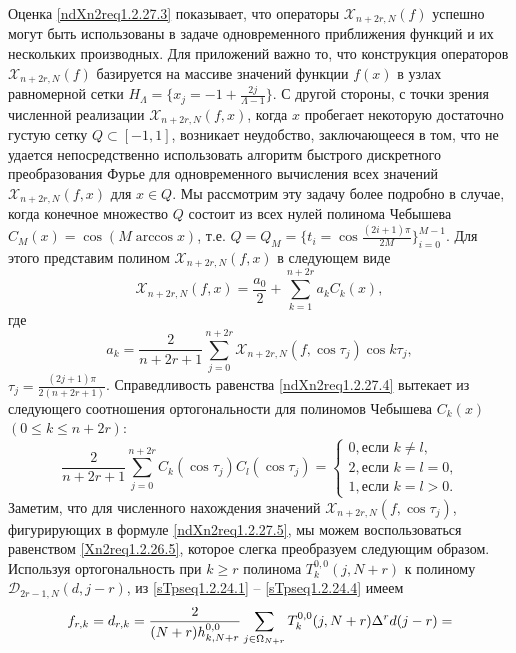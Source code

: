 Оценка \eqref{ndXn2req1.2.27.3} показывает, что операторы $\mathcal{X}_{n+2r,N}(f)$ успешно могут быть использованы в задаче одновременного приближения функций и их нескольких производных. Для приложений важно то, что конструкция операторов $\mathcal{X}_{n+2r,N}(f)$ базируется на массиве  значений функции $f(x)$ в узлах равномерной сетки   $H_\Lambda=\{x_j=-1+\frac{2j}{\Lambda-1}\}$. С другой стороны, с точки зрения численной реализации $\mathcal{X}_{n+2r,N}(f,x)$, когда   $x$ пробегает некоторую достаточно густую сетку $Q\subset[-1,1]$, возникает неудобство, заключающееся в том, что не удается непосредственно использовать алгоритм быстрого дискретного преобразования Фурье для одновременного вычисления всех значений
$\mathcal{X}_{n+2r,N}(f,x)$ для $x\in Q$. Мы рассмотрим эту задачу более подробно в случае, когда конечное множество $Q$ состоит из всех нулей
полинома Чебышева $C_M(x)=\cos(M\arccos x)$, т.е. $Q=Q_M=\{t_i=\cos\frac{(2i+1)\pi}{2M}\}_{i=0}^{M-1}$. Для этого представим полином $\mathcal{X}_{n+2r,N}(f,x)$ в следующем виде
\begin{equation}\label{ndXn2req1.2.27.4}
\mathcal{X}_{n+2r,N}(f,x)=\frac{a_0}{2}+\sum_{k=1}^{n+2r}a_kC_k(x),
\end{equation}
где
\begin{equation}\label{ndXn2req1.2.27.5}
a_k =\frac{2}{n+2r+1}\sum_{j=0}^{n+2r}\mathcal{X}_{n+2r,N}(f,\cos\tau_j)\cos k\tau_j,
\end{equation}
 $\tau_j= \frac{(2j+1)\pi}{2(n+2r+1)}$. Справедливость равенства \eqref{ndXn2req1.2.27.4} вытекает из следующего соотношения ортогональности для полиномов Чебышева $C_k(x)$ $(0\le k\le n+2r)$:
\begin{equation}\label{ndXn2req1.2.27.6}
\frac{2}{n+2r+1}\sum_{j=0}^{n+2r}C_k(\cos\tau_j)C_l(\cos\tau_j)=\begin{cases} 0, \text{если $k\ne l$,}\\
2, \text{если $k=l=0$,}\\1,\text{если $k=l>0$}.\end{cases}
\end{equation}
Заметим, что для численного нахождения значений $\mathcal{X}_{n+2r,N}(f,\cos\tau_j)$, фигурирующих в формуле \eqref{ndXn2req1.2.27.5}, мы можем воспользоваться равенством \eqref{Xn2req1.2.26.5}, которое слегка преобразуем следующим образом. Используя ортогональность при $k\ge r$  полинома $T_k^{0,0}(j,N+r)$ к полиному $\mathcal{D}_{2r-1,N}(d,j-r)$, из \eqref{sTpseq1.2.24.1} -- \eqref{sTpseq1.2.24.4} имеем
  $$
 f_{r,k}=d_{r,k}   ={2\over (N+r)h_{k,N+r}^{0,0}}
     \sum_{j\in\Omega_{N+r}}T_k^{0,0}(j,N+r)\Delta^rd(j-r)=
     $$
